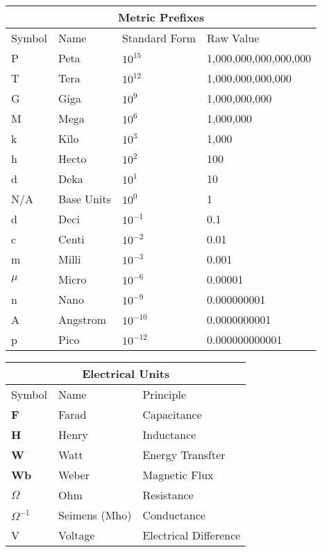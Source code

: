 \documentclass[12pt]{article}
\begin{document}
\begin{center}
    \begin{tabular}{ |p{3cm}|p{3cm}|p{3cm}|p{4cm}|  }
        \hline
        \multicolumn{4}{|c|}{Metric Prefixes} \\
        \hline
            Symbol & Name & Standard Form & Raw Value \\
        \hline
            P & Peta & $10^{15}$ & 1,000,000,000,000,000 \\
            T & Tera & $10^{12}$ & 1,000,000,000,000 \\
            G & Giga & $10^{9}$ & 1,000,000,000 \\
            M & Mega & $10^{6}$ & 1,000,000 \\
            k & Kilo & $10^{3}$ & 1,000 \\
            h & Hecto & $10^{2}$ & 100 \\     
            d & Deka & $10^{1}$ & 10 \\
            N/A & Base Units & $10^0$ & 1 \\
            d & Deci & $10^{-1}$ & 0.1 \\
            c & Centi & $10^{-2}$ & 0.01 \\
            m & Milli & $10^{-3}$ & 0.001 \\
            $\mu$ & Micro & $10^{-6}$ & 0.00001 \\
            n & Nano & $10^{-9}$ & 0.000000001 \\
            A & Angstrom & $10^{-10}$ & 0.0000000001 \\
            p & Pico& $10^{-12}$ & 0.000000000001 \\  
        \hline
    \end{tabular}
\end{center}

\begin{center}
    \begin{tabular}{ |p{4cm}|p{4cm}|p{4cm}|  }
        \hline
        \multicolumn{3}{|c|}{Electrical Units} \\
        \hline
            Symbol & Name & Principle\\
        \hline
            \textbf{F} & Farad & Capacitance\\
            \textbf{H} & Henry & Inductance\\
            \textbf{W} & Watt & Energy Transfter\\
            \textbf{Wb} & Weber & Magnetic Flux\\
            $\Omega$ & Ohm & Resistance\\
            $\Omega^{-1}$ & Seimens (Mho) & Conductance\\
            V & Voltage & Electrical Difference\\

            
        \hline
    \end{tabular}
\end{center}
\end{document}
